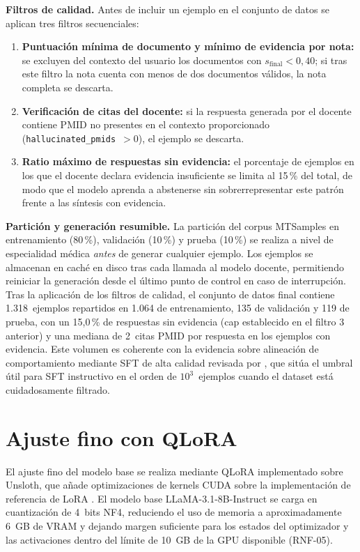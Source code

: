 \documentclass[11pt,a4paper,spanish]{book}
\numberwithin{equation}{chapter}
\numberwithin{figure}{chapter}
\begin{document}
\textbf{Filtros de calidad.} Antes de incluir un ejemplo en el conjunto de datos se aplican tres filtros secuenciales:
\begin{enumerate}
  \item \textbf{Puntuación mínima de documento y mínimo de evidencia por nota:} se excluyen del contexto del usuario los documentos con $s_{\text{final}} < 0{,}40$; si tras este filtro la nota cuenta con menos de dos documentos válidos, la nota completa se descarta.
  \item \textbf{Verificación de citas del docente:} si la respuesta generada por el docente contiene PMID no presentes en el contexto proporcionado (\texttt{hallucinated\_pmids}~$> 0$), el ejemplo se descarta.
  \item \textbf{Ratio máximo de respuestas sin evidencia:} el porcentaje de ejemplos en los que el docente declara evidencia insuficiente se limita al 15\,\% del total, de modo que el modelo aprenda a abstenerse sin sobrerrepresentar este patrón frente a las síntesis con evidencia.
\end{enumerate}

\textbf{Partición y generación resumible.} La partición del corpus MTSamples en entrenamiento (80\,\%), validación (10\,\%) y prueba (10\,\%) se realiza a nivel de especialidad médica \emph{antes} de generar cualquier ejemplo. Los ejemplos se almacenan en caché en disco tras cada llamada al modelo docente, permitiendo reiniciar la generación desde el último punto de control en caso de interrupción. Tras la aplicación de los filtros de calidad, el conjunto de datos final contiene 1.318~ejemplos repartidos en 1.064 de entrenamiento, 135 de validación y 119 de prueba, con un 15{,}0\,\% de respuestas sin evidencia (cap establecido en el filtro 3 anterior) y una mediana de 2~citas PMID por respuesta en los ejemplos con evidencia. Este volumen es coherente con la evidencia sobre alineación de comportamiento mediante SFT de alta calidad revisada por , que sitúa el umbral útil para SFT instructivo en el orden de $10^3$~ejemplos cuando el dataset está cuidadosamente filtrado.

\section{Ajuste fino con QLoRA}
\label{sec:c5_qlora}

El ajuste fino del modelo base se realiza mediante QLoRA \cite{dettmers2023qloraefficientfinetuningquantized} implementado sobre Unsloth, que añade optimizaciones de kernels CUDA sobre la implementación de referencia de LoRA \cite{hu2021loralowrankadaptationlarge}. El modelo base LLaMA-3.1-8B-Instruct se carga en cuantización de 4~bits NF4, reduciendo el uso de memoria a aproximadamente 6~GB de VRAM y dejando margen suficiente para los estados del optimizador y las activaciones dentro del límite de 10~GB de la GPU disponible (RNF-05).
\end{document}
